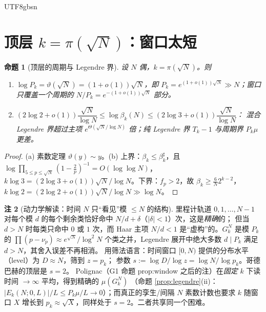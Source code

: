 \documentclass[11pt,a4paper]{article}
\newcommand{\Haar}{\mu}
\newcommand{\status}[1]{\par\noindent\fbox{\textbf{状态：#1}}\par\smallskip}
\newcommand{\Tleg}{T}                   %
\theoremstyle{plain}
\newtheorem{prop}{命题}[section]
\theoremstyle{definition}
\newtheorem{rem}[prop]{注}
\begin{document}
\begin{CJK}{UTF8}{gbsn}
\section{顶层 $k=\pi(\sqrt N)$：窗口太短}\label{sec:top}

\begin{prop}[顶层的周期与 Legendre 界]\label{prop:top}
设 $N$ 偶，$k=\pi(\sqrt N)$。则
\begin{enumerate}[label=(\alph*)]
\item $\log P_k=\vartheta(\sqrt N)=(1+o(1))\sqrt N$，即 $P_k=e^{(1+o(1))\sqrt N}\gg N$；窗口只覆盖一个周期的
$N/P_k=e^{-(1+o(1))\sqrt N}$ 部分。
\item $(2\log2+o(1))\dfrac{\sqrt N}{\log N}\le\log\beta_k(N)\le(2\log3+o(1))\dfrac{\sqrt N}{\log N}$：
混合 Legendre 界超过主项 $e^{\Theta(\sqrt N/\log N)}$ 倍；纯 Legendre 界 $\Tleg_k-1$ 与周期界 $P_k\Haar$ 更差。
\end{enumerate}
\end{prop}
\status{已证（素数定理）}
\begin{proof}
(a) 素数定理 $\vartheta(y)\sim y$。(b) 上界：$\beta_k\le\beta_k^\sharp$，且 $\log\prod_{5\le p\le\sqrt N}(1-\frac2p)^{-1}=O(\log\log N)$，
$k\log3=(2\log3+o(1))\sqrt N/\log N$。下界：$f_p>2$，故 $\beta_k\ge\frac6N2^{k-2}$，$k\log2=(2\log2+o(1))\sqrt N/\log N\gg\log N$。
\end{proof}

\begin{rem}[动力学解读：时间 $N$ 只“看见”模 $\le N$ 的结构]\label{rem:level}
里程计轨道 $0,1,\dots,N-1$ 对每个模 $d$ 的每个剩余类恰好命中 $N/d+\delta$（$|\delta|<1$）次，这是\emph{精确}的；
但当 $d>N$ 时每类只命中 $0$ 或 $1$ 次，而 Haar 主项 $N/d<1$ 是“虚构”的。$G_k^N$ 是模 $P_k$ 的
$\prod(p-\nu_p)\approx e^{\sqrt N}/\log^2N$ 个类之并，Legendre 展开中绝大多数 $d\mid P_k$ 满足 $d>N$，其舍入误差不再相消。
用筛法语言：时间窗口 $[0,N)$ 提供的分布水平（level）为 $D\approx N$，筛到 $z=p_k$；
参数 $s:=\log D/\log z=\log N/\log p_k$。哥德巴赫的顶层是 $s=2$。
Polignac（G1 命题 prop:window 之后的注）在\emph{固定} $k$ 下读时间 $\to\infty$ 平均，得到精确的 $\Haar(G_k^N)$
（命题 \ref{prop:legendre}(ii)：$|E_k(N;0,L)|/L\le P_k\Haar/L\to0$）；而真正的孪生/间隔 $N$ 素数计数也要求 $k$ 随窗口 $X$ 增长到
$p_k\approx\sqrt X$，同样处于 $s=2$。二者共享同一个困难。
\end{rem}


\end{CJK}
\end{document}
